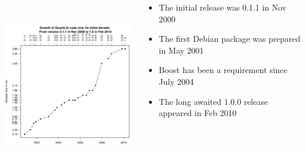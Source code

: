 \documentclass[compress]{beamer}
\begin{document}
\begin{frame}
\begin{columns}

    \begin{column}{2.9in}
      \includegraphics[height=2.9in]{figures/qlReleases.pdf}
    \end{column}
    
    \begin{column}{2in}
      \begin{itemize}
      \item The initial release was 0.1.1 in Nov 2000
      \item The first Debian package was prepared in May 2001
      \item Boost has been a requirement since July 2004
      \item The long awaited 1.0.0 release appeared in Feb 2010
      \end{itemize}
    \end{column}
  \end{columns}
\end{frame}
\end{document}
